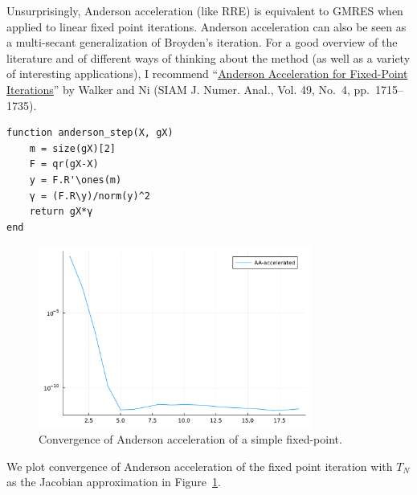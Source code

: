 \documentclass[12pt, leqno]{article} %
\begin{document}
Unsurprisingly, Anderson acceleration (like RRE) is equivalent to GMRES
when applied to linear fixed point iterations. Anderson acceleration can
also be seen as a multi-secant generalization of Broyden's iteration.
For a good overview of the literature and of different ways of thinking
about the method (as well as a variety of interesting applications), I
recommend ``\href{https://doi.org/10.1137/10078356X}{Anderson
Acceleration for Fixed-Point Iterations}'' by Walker and Ni (SIAM J.
Numer. Anal., Vol. 49, No.~4, pp.~1715--1735).

\begin{verbatim}
function anderson_step(X, gX)
    m = size(gX)[2]
    F = qr(gX-X)
    y = F.R'\ones(m)
    γ = (F.R\y)/norm(y)^2
    return gX*γ
end
\end{verbatim}

\begin{figure}
\begin{center}
  \includegraphics[width=0.8\textwidth]{fig/2023-04-14-aa.pdf}
\end{center}
\caption{Convergence of Anderson acceleration of a simple fixed-point.}
\label{fig:aa-cvg}
\end{figure}

We plot convergence of Anderson acceleration of the fixed point iteration
with $T_N$ as the Jacobian approximation in Figure~\ref{fig:aa-cvg}.
\end{document}
